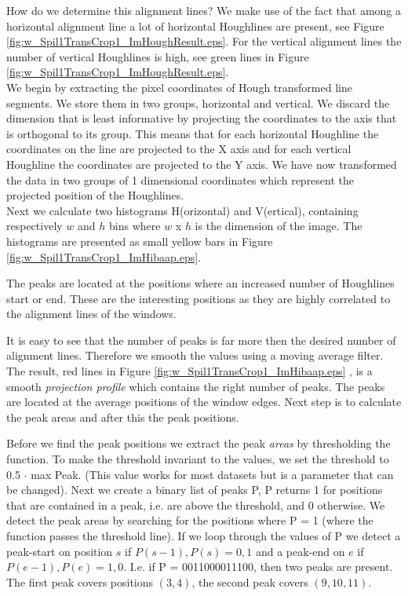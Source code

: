 How do we determine this alignment lines? We make use of the fact that among a
horizontal alignment line a lot of horizontal Houghlines are present, see
Figure \ref{fig:w_Spil1TransCrop1_ImHoughResult.eps}. For the vertical alignment lines
the number of vertical Houghlines is high, see green lines in Figure
\ref{fig:w_Spil1TransCrop1_ImHoughResult.eps}.\\

We begin by extracting the pixel coordinates of Hough transformed line
segments. We store them in two groups, horizontal and vertical.%
We discard the dimension that is least informative by projecting the coordinates to
the axis that is orthogonal to its group. 
This means that for each horizontal Houghline the coordinates on the line are projected to the X
axis and for each vertical Houghline the coordinates are projected to the Y
axis. We have now transformed the data in two groups of 1 dimensional
coordinates which represent the projected position of the Houghlines.\\

Next we calculate two histograms H(orizontal) and V(ertical), containing respectively
$w$ and $h$ bins where $w$ x $h$ is the dimension of the image.  The histograms
are presented as small yellow bars in Figure \ref{fig:w_Spil1TransCrop1_ImHibaap.eps}.

The peaks are located at the positions where an increased number of Houghlines
start or end.  These are the interesting positions as they are highly correlated
to the alignment lines of the windows. 

It is easy to see that the number of peaks is far more then the desired number of alignment lines.
Therefore we smooth the values using a moving average filter.
The result, red lines in Figure \ref{fig:w_Spil1TransCrop1_ImHibaap.eps}
, is a smooth \emph{projection profile} which contains the right number of peaks. The peaks
are located at the average positions of the window edges. Next step is to
calculate the peak areas and after this the peak positions. 

Before we find the peak positions we extract the peak \emph{areas} by thresholding the
function. To make the threshold invariant to the values, we set the threshold to 0.5 $\cdot$ max Peak. 
(This value works for most datasets but is a parameter that can be changed).
Next we create a binary list of peaks P, P returns 1 for positions that are contained in
a peak, i.e. are above the threshold, and 0 otherwise.
We detect the peak areas by searching for the positions where P = 1
(where the function passes the threshold line). 
If we loop through the values of P we detect a peak-start on position $s$ if ${P(s-1),P(s)}={0,1}$
and a peak-end on $e$ if ${P(e-1),P(e)}={1,0}$. 
I.e. if P = 0011000011100, then two peaks are present. The first peak covers positions $(3,4)$, 
the second peak covers $(9,10,11)$.\\

